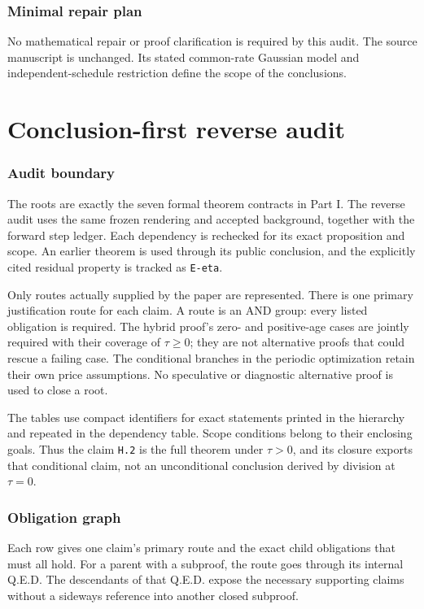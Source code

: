 \documentclass[11pt,letterpaper]{article}
\begin{document}
\section{Minimal repair plan}
No mathematical repair or proof clarification is required by this audit. The source manuscript is unchanged. Its stated common-rate Gaussian model and independent-schedule restriction define the scope of the conclusions.

\clearpage
\part{Conclusion-first reverse audit}
\section{Audit boundary}
The roots are exactly the seven formal theorem contracts in Part I. The reverse audit uses the same frozen rendering and accepted background, together with the forward step ledger. Each dependency is rechecked for its exact proposition and scope. An earlier theorem is used through its public conclusion, and the explicitly cited residual property is tracked as \texttt{E-eta}.

Only routes actually supplied by the paper are represented. There is one primary justification route for each claim. A route is an AND group: every listed obligation is required. The hybrid proof's zero- and positive-age cases are jointly required with their coverage of $\tau\ge0$; they are not alternative proofs that could rescue a failing case. The conditional branches in the periodic optimization retain their own price assumptions. No speculative or diagnostic alternative proof is used to close a root.

The tables use compact identifiers for exact statements printed in the hierarchy and repeated in the dependency table. Scope conditions belong to their enclosing goals. Thus the claim \texttt{H.2} is the full theorem under $\tau>0$, and its closure exports that conditional claim, not an unconditional conclusion derived by division at $\tau=0$.

\section{Obligation graph}
Each row gives one claim's primary route and the exact child obligations that must all hold. For a parent with a subproof, the route goes through its internal Q.E.D. The descendants of that Q.E.D. expose the necessary supporting claims without a sideways reference into another closed subproof.
\end{document}
